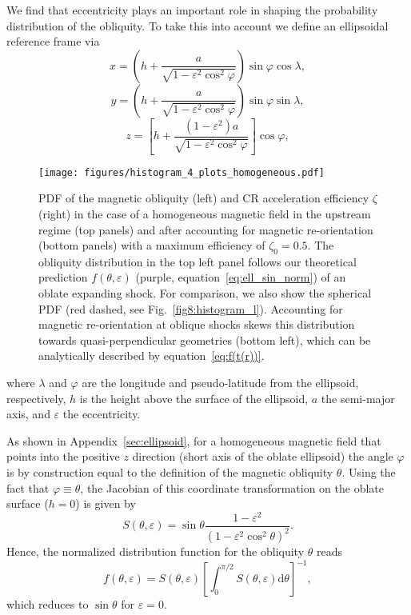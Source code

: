 \documentclass[8pt,a4paper,usenatbib]{mnras}
\newcommand{\de}{\mathrm{d}}
\renewcommand{\epsilon}{\varepsilon}
\begin{document}
We find that eccentricity plays an important role in shaping the probability
distribution of the obliquity. To take this into account we define an
ellipsoidal reference frame via
\begin{equation}
x =  \left(h  + \dfrac{a}{\sqrt{1 - \epsilon^2 \cos^2 \varphi}}\right) \sin\varphi \cos\lambda,
\end{equation}
\begin{equation}
y =  \left(h  + \dfrac{a}{\sqrt{1 - \epsilon^2 \cos^2 \varphi}}\right) \sin\varphi \sin\lambda,
\end{equation}
\begin{equation}
z = \left[ h + \dfrac{(1-\epsilon^2)a}{\sqrt{1-\epsilon^2 \cos^2 \varphi}} \right] \cos\varphi,
\end{equation}

\begin{figure*}
\centering
\texttt{[image: figures/histogram\_4\_plots\_homogeneous.pdf]} 
\caption{PDF of the magnetic obliquity (left) and CR acceleration efficiency
  $\zeta$ (right) in the case of a homogeneous magnetic field in the upstream
  regime (top panels) and after accounting for magnetic re-orientation (bottom
  panels) with a maximum efficiency of $\zeta_0 = 0.5$.  The obliquity
  distribution in the top left panel follows our theoretical prediction
  $f(\theta,\epsilon)$ (purple, equation~\ref{eq:ell_sin_norm}) of an oblate
  expanding shock. For comparison, we also show the spherical PDF (red dashed,
  see Fig.~\ref{fig8:histogram_l}). Accounting for magnetic re-orientation at
  oblique shocks skews this distribution towards quasi-perpendicular geometries
  (bottom left), which can be analytically described by
  equation~\eqref{eq:f(t(r))}. }
\label{fig9:histogram_h}
\end{figure*}

where $\lambda$ and $\varphi$ are the longitude and pseudo-latitude from the
ellipsoid, respectively, $h$ is the height above the surface of the ellipsoid,
$a$ the semi-major axis, and $\epsilon$ the eccentricity.  

As shown in Appendix~\ref{sec:ellipsoid}, for a homogeneous magnetic field that points into the
positive $z$ direction (short axis of the oblate ellipsoid) the angle $\varphi$
is by construction equal to the definition of the magnetic obliquity $\theta$.
Using the fact that $\varphi \equiv \theta$, the Jacobian of this coordinate
transformation on the oblate surface ($h=0$) is given by
\begin{equation}
\label{eq:ell_sin}
S(\theta,\epsilon) =  \sin \theta
 \dfrac{1-\epsilon^2}{(1 - \epsilon^2 \cos^2\theta)^2}.
\end{equation}
Hence, the normalized distribution function for the obliquity $\theta$ reads
\begin{equation}
\label{eq:ell_sin_norm}
f(\theta,\epsilon) =  S(\theta,\epsilon)
\left[  \int_0^{\pi/2} S(\theta,\epsilon) \de \theta \right]^{-1},
\end{equation}
which reduces to $\sin\theta$ for $\epsilon = 0$. 
\end{document}

